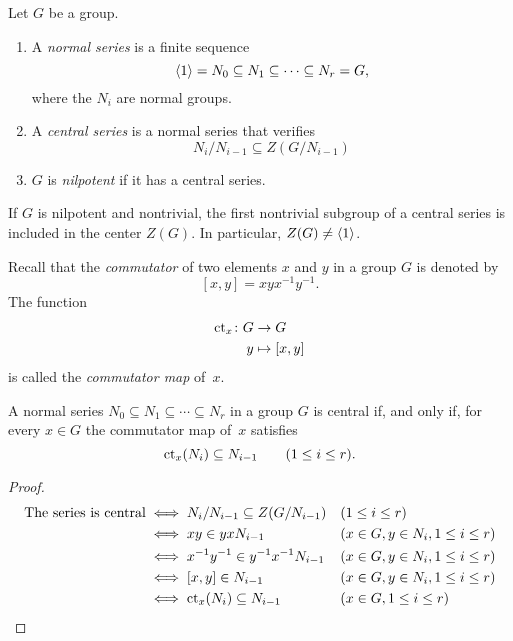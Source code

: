 \begin{defns}Let $G$ be a group.
    \begin{enumerate}[\rm i)]
        \item A \textsl{normal series} is a finite sequence
        $$
            \langle1\rangle=N_0\subseteq N_1\subseteq\cdots\subseteq N_r=G,
        $$
        where the $N_i$ are normal groups.

        \item A \textsl{central series} is a normal series that verifies
        $$
            N_i/N_{i-1}\subseteq Z(G/N_{i-1})
        $$
        \item $G$ is \textsl{nilpotent} if it has a central series.
    \end{enumerate}
\end{defns}

\begin{rem}\label{nontrivial-nilpotent-center}
    If\/ $G$ is nilpotent and nontrivial, the first nontrivial subgroup of a central series is included in the center\/ $Z(G)$. In particular, $Z(G)\ne\langle1\rangle$.
\end{rem}

\begin{ntns}
    Recall that the \textsl{commutator} of two elements $x$ and $y$ in a group $G$ is denoted by
    $$
        [x,y] = xyx^{-1}y^{-1}.
    $$
    The function
    \begin{align*}
        \operatorname{\operatorname{ct}}_x\colon G&\to G\\
        y&\mapsto[x,y]
    \end{align*}
    is called the \textsl{commutator map} of~$x$.
\end{ntns}

\begin{prop}\label{ad-nilpotent-test}
    A normal series $N_0\subseteq N_1\subseteq\cdots\subseteq N_r$ in a group $G$ is central if, and only if, for every $x\in G$ the commutator map of~$x$ satisfies
    $$
        \operatorname{\operatorname{ct}}_x(N_i)\subseteq N_{i-1}\qquad(1\le i\le r).
    $$
\end{prop}
\begin{proof}
\begin{align*}
    \text{The series is central}
        &\iff N_i/N_{i-1}\subseteq Z(G/N_{i-1})&&(1\le i\le r)\\
        &\iff xy\in yxN_{i-1}&&(x\in G, y\in N_i, 1\le i\le r)\\
        &\iff x^{-1}y^{-1}\in y^{-1}x^{-1}N_{i-1}
            &&(x\in G, y\in N_i, 1\le i\le r)\\
        &\iff [x,y]\in N_{i-1}
            &&(x\in G, y\in N_i, 1\le i\le r)\\
        &\iff \operatorname{\operatorname{ct}}_x(N_i)\subseteq N_{i-1}&&(x\in G,1\le i\le r)
\end{align*}
 \end{proof}


